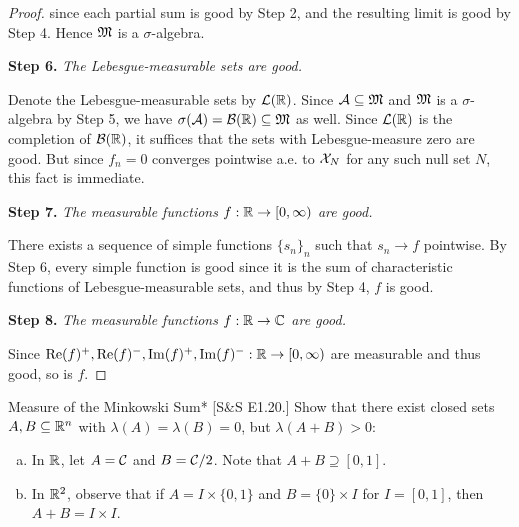 \begin{proof}
    since each partial sum is good by Step 2, and the resulting limit is good by Step 4. Hence $\mathfrak{M}$ is a $\sigma$-algebra. 

    \textbf{Step 6.} \textit{The Lebesgue-measurable sets are good.}

    Denote the Lebesgue-measurable sets by $\mathcal{L}(\mathbb{R})$. Since $\mathcal{A} \subseteq \mathfrak{M}$ and $\mathfrak{M}$ is a $\sigma$-algebra by Step 5, we have $\sigma(\mathcal{A}) = \mathcal{B}(\mathbb{R}) \subseteq \mathfrak{M}$ as well. Since $\mathcal{L}(\mathbb{R})$ is the completion of $\mathcal{B}(\mathbb{R})$, it suffices that the sets with Lebesgue-measure zero are good. But since $f_n = 0$ converges pointwise a.e. to $\mathcal{X}_N$ for any such null set $N$, this fact is immediate. 

    \textbf{Step 7.} \textit{The measurable functions $f : \mathbb{R} \to [0, \infty)$ are good.}

    There exists a sequence of simple functions $\{s_n\}_n$ such that $s_n \to f$ pointwise. By Step 6, every simple function is good since it is the sum of characteristic functions of Lebesgue-measurable sets, and thus by Step 4, $f$ is good. 

    \textbf{Step 8.} \textit{The measurable functions $f : \mathbb{R} \to \mathbb{C}$ are good.}

    Since $\Re(f)^+, \Re(f)^-, \Im(f)^+, \Im(f)^- : \mathbb{R} \to [0, \infty)$ are measurable and thus good, so is $f$. 
\end{proof}

\begin{problem}{Measure of the Minkowski Sum}*
    [S\&S E1.20.] Show that there exist closed sets $A,B \subseteq \mathbb{R}^n$ with $\lambda(A) = \lambda(B) = 0$, but $\lambda(A+B) > 0$:
    \begin{enumerate}[(a)]
        \item In $\mathbb{R}$, let $A = \mathcal{C}$ and $B = \mathcal{C}/2$. Note that $A+B \supseteq [0, 1]$.
        \item In $\mathbb{R}^2$, observe that if $A = I \times \{0,1\}$ and $B = \{0\} \times I$ for $I = [0,1]$, then $A+B = I \times I$. 
    \end{enumerate}
\end{problem}

